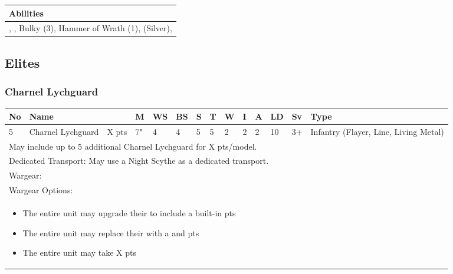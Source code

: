 \noindent
\begin{tabular}{||m{532pt}||}
	\hline
	Abilities \\
	\hline
	\quickref{Annihilation Protocols}, \quickref{Command Protocols}, Bulky (3), Hammer of Wrath (1), \quickref{Nodal Command} (Silver), \quickref{Reanimation Protocols} \\
	\hline
\end{tabular}


\newpage
\subsection{Elites}

\subsubsection{Charnel Lychguard}

\noindent
\begin{tabular}{||m{10pt} m{90pt} m{30pt} m{11pt} m{11pt} m{11pt} m{11pt} m{11pt} m{11pt} m{11pt} m{11pt} m{11pt} m{11pt} m{135pt}||}
	\hline
	No & Name & & M & WS & BS & S & T & W & I & A & LD & Sv & Type \\
	\hline
	5 & Charnel Lychguard & X pts & 7" & 4 & 4 & 5 & 5 & 2 & 2 & 2 & 10 & 3+ & Infantry (Flayer, Line, Living Metal)\\
	\hline
	\hline
	\multicolumn{14}{||Z{532 pt}||}{May include up to 5 additional Charnel Lychguard for X pts/model.}\\	
	\multicolumn{14}{||Z{532 pt}||}{Dedicated Transport: May use a Night Scythe as a dedicated transport.}\\	
	\hline
	\hline
	\multicolumn{14}{||Z{532 pt}||}{Wargear: \quickref{Warscythe}}\\
	\multicolumn{14}{||Z{532 pt}||}{Wargear Options:} \\
	\multicolumn{14}{||Z{532 pt}||}{\begin{itemize}
			\item The entire unit may upgrade their \quickref{Warscythe} to include a built-in \quickref{Gauss Blaster} \hrulefill 5 pts
			\item The entire unit may replace their \quickref{Warscythe} with a \quickref{Hyperphase Sword} and \quickref{Dispersion Shield} \hrulefill 10 pts
			\item The entire unit may take \quickref{Flensing Scarabs} \hrulefill X pts
	\end{itemize}} \\
	\hline
\end{tabular}

